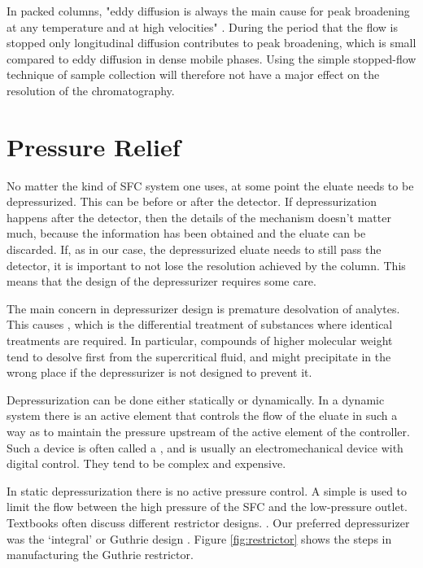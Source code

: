 In packed columns, "eddy diffusion is always the main cause for peak broadening
at any temperature and at high velocities" \autocite{Gritti2006}. During the
period that the flow is stopped only longitudinal diffusion contributes to peak
broadening, which is small compared to eddy diffusion in dense mobile phases.
Using the simple stopped-flow technique of sample collection will therefore not
have a major effect on the resolution of the \oneD chromatography.


\section{Pressure Relief}

No matter the kind of SFC system one uses, at some point the eluate needs to be
depressurized. This can be before or after the detector. If depressurization
happens after the detector, then the details of the mechanism doesn't matter
much, because the information has been obtained and the eluate can be discarded.
If, as in our case, the depressurized eluate needs to still pass the detector,
it is important to not lose the resolution achieved by the column.
This means that the design of the depressurizer requires some care.

The main concern in depressurizer design is premature desolvation of analytes.
This causes , which is the differential treatment of
substances where identical treatments are required. In particular, compounds of
higher molecular weight tend to desolve first from the supercritical fluid, and
might precipitate in the wrong place if the depressurizer is not designed to
prevent it. 

Depressurization can be done either statically or dynamically. In a dynamic
system there is an active element that controls the flow of the eluate in such a
way as to maintain the pressure upstream of the active element of the
controller. Such a device is often called a ,
and is usually an electromechanical device with digital control. They tend to
be complex and expensive.

In static depressurization there is no active pressure control. A simple
 is used to limit the flow between the high pressure of the
SFC and the low-pressure outlet. Textbooks often discuss different restrictor
designs. \autocite[The book by][provides an example.]{LuquedeCastro1994}. Our
preferred depressurizer was the `integral' or Guthrie design
\autocite{Guthrie1986}. Figure \ref{fig:restrictor} shows the steps in
manufacturing the Guthrie restrictor.

